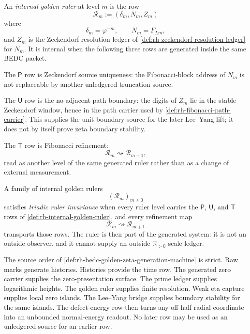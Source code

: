\begin{definition}
\label{def:rh-internal-golden-ruler}
An \emph{internal golden ruler} at level $m$ is the row
$$
\mathcal R_m:=
(\delta_m,N_m,Z_m)
$$
where
$$
\delta_m=\varphi^{-m},
\qquad
N_m=F_{Lm},
$$
and $Z_m$ is the Zeckendorf resolution ledger of
\autoref{def:rh-zeckendorf-resolution-ledger} for $N_m$.  It is internal
when the following three rows are generated inside the same BEDC packet.

The $\mathsf P$ row is Zeckendorf source uniqueness: the Fibonacci-block
address of $N_m$ is not replaceable by another unledgered truncation
source.

The $\mathsf U$ row is the no-adjacent path boundary: the digits of
$Z_m$ lie in the stable Zeckendorf window, hence in the path carrier used
by \autoref{def:rh-fibonacci-path-carrier}.  This supplies the
unit-boundary source for the later Lee--Yang lift; it does not by itself
prove zeta boundary stability.

The $\mathsf T$ row is Fibonacci refinement:
$$
\mathcal R_m\rightsquigarrow\mathcal R_{m+1},
$$
read as another level of the same generated ruler rather than as a
change of external measurement.
\end{definition}

\begin{definition}
\label{def:rh-triadic-ruler-invariance}
A family of internal golden rulers
$$
(\mathcal R_m)_{m\ge0}
$$
satisfies \emph{triadic ruler invariance} when every ruler level carries
the $\mathsf P$, $\mathsf U$, and $\mathsf T$ rows of
\autoref{def:rh-internal-golden-ruler}, and every refinement map
$$
\mathcal R_m\rightsquigarrow\mathcal R_{m+1}
$$
transports those rows.  The ruler is then part of the generated system:
it is not an outside observer, and it cannot supply an outside
$\mathbb R_{>0}$ scale ledger.
\end{definition}

\begin{principle}
\label{prin:rh-bedc-golden-zeta-machine-source-order}
The source order of \autoref{def:rh-bedc-golden-zeta-generation-machine}
is strict.  Raw marks generate histories.  Histories provide the time
row.  The generated zero carrier supplies the zero-presentation surface.
The prime ledger supplies logarithmic heights.  The golden ruler supplies
finite resolution.  Weak eta capture supplies local zero islands.
The Lee--Yang bridge supplies boundary stability for the same islands.
The defect-energy row then turns any off-half radial coordinate into an
unbounded normal-energy readout.  No later row may be used as an
unledgered source for an earlier row.
\end{principle}

